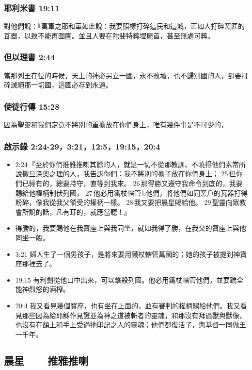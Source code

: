 \subsubsection{耶利米書 19:11}
對他們說：『萬軍之耶和華如此說：我要照樣打碎這民和這城，正如人打碎窯匠的瓦器，以致不能再囫圇。並且人要在陀斐特葬埋屍首，甚至無處可葬。

\subsubsection{但以理書 2:44}
當那列王在位的時候，天上的神必另立一國，永不敗壞，也不歸別國的人，卻要打碎滅絕那一切國，這國必存到永遠。

\subsubsection{使徒行傳 15:28}
因為聖靈和我們定意不將別的重擔放在你們身上，唯有幾件事是不可少的，

\subsubsection{啟示錄 2:24-29，3:21，12:5，19:15，20:4 }
\begin{itemize} 
\itemsep-.25em
\item 2:24 『至於你們推雅推喇其餘的人，就是一切不從那教訓、不曉得他們素常所說撒旦深奧之理的人，我告訴你們：我不將別的擔子放在你們身上； 25 但你們已經有的，總要持守，直等到我來。 26 那得勝又遵守我命令到底的，我要賜給他權柄制伏列國， 27 他必用鐵杖轄管 b他們，將他們如同窯戶的瓦器打得粉碎，像我從我父領受的權柄一樣。 28 我又要把晨星賜給他。 29 聖靈向眾教會所說的話，凡有耳的，就應當聽！』
\item 得勝的，我要賜他在我寶座上與我同坐，就如我得了勝，在我父的寶座上與他同坐一般。
\item 3:21 婦人生了一個男孩子，是將來要用鐵杖轄管萬國的；她的孩子被提到神寶座那裡去了。
\item 19:15 有利劍從他口中出來，可以擊殺列國。他必用鐵杖轄管他們，並要踹全能神烈怒的酒榨。
\item 20:4 我又看見幾個寶座，也有坐在上面的，並有審判的權柄賜給他們。我又看見那些因為給耶穌作見證並為神之道被斬者的靈魂，和那沒有拜過獸與獸像，也沒有在額上和手上受過牠印記之人的靈魂；他們都復活了，與基督一同做王一千年。
\end{itemize} 

\subsection{晨星——推雅推喇}

